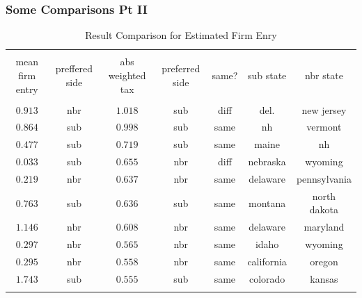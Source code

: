 \documentclass{beamer}
\begin{document}
\begin{frame}
\frametitle{Some Comparisons Pt II}

\begin{table}[!htbp] \centering 
  \caption{Result Comparison for Estimated Firm Enry} 
  \label{taxtable} 
\tiny 
\begin{tabular}{@{\extracolsep{5pt}} ccccccc} 
\\[-1.8ex]\hline 
\hline \\[-1.8ex] 
mean firm entry & preffered side & abs weighted tax & preferred side & same? & sub state & nbr state \\ 
\hline \\[-1.8ex] 
$0.913$ & nbr & $1.018$ & sub & diff & del. & new jersey \\ 
$0.864$ & sub & $0.998$ & sub & same & nh & vermont \\ 
$0.477$ & sub & $0.719$ & sub & same & maine & nh \\ 
$0.033$ & sub & $0.655$ & nbr & diff & nebraska & wyoming \\ 
$0.219$ & nbr & $0.637$ & nbr & same & delaware & pennsylvania \\ 
$0.763$ & sub & $0.636$ & sub & same & montana & north dakota \\ 
$1.146$ & nbr & $0.608$ & nbr & same & delaware & maryland \\ 
$0.297$ & nbr & $0.565$ & nbr & same & idaho & wyoming \\ 
$0.295$ & nbr & $0.558$ & nbr & same & california & oregon \\ 
$1.743$ & sub & $0.555$ & sub & same & colorado & kansas \\ 
\hline \\[-1.8ex] 
\end{tabular}
\end{table} 

\end{frame}
\end{document}
